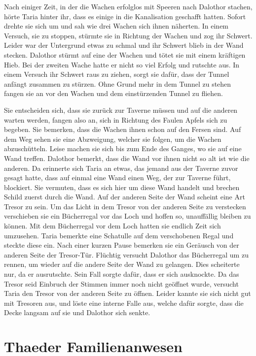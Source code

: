 \documentclass[10pt,twoside,twocolumn,openany]{book}
\begin{document}
	Nach einiger Zeit, in der die Wachen erfolglos mit Speeren nach Dalothor stachen, hörte Taria hinter ihr, dass es einige in die Kanalisation geschafft hatten. Sofort drehte sie sich um und sah wie drei Wachen sich ihnen näherten. In einem Versuch, sie zu stoppen, stürmte sie in Richtung der Wachen und zog ihr Schwert. Leider war der Untergrund etwas zu schmal und ihr Schwert blieb in der Wand stecken. Dalothor stürmt auf eine der Wachen und tötet sie mit einem kräftigen Hieb. Bei der zweiten Wache hatte er nicht so viel Erfolg und rutschte aus. In einem Versuch ihr Schwert raus zu ziehen, sorgt sie dafür, dass der Tunnel anfängt zusammen zu stürzen. Ohne Grund mehr in dem Tunnel zu stehen fangen sie an vor den Wachen und dem einstürzenden Tunnel zu fliehen. 

	Sie entscheiden sich, dass sie zurück zur Taverne müssen und auf die anderen warten werden, fangen also an, sich in Richtung des Faulen Apfels sich zu begeben. Sie bemerken, dass die Wachen ihnen schon auf den Fersen sind. Auf dem Weg sehen sie eine Abzweigung, welcher sie folgen, um die Wachen abzuschütteln. Leise machen sie sich bis zum Ende des Ganges, wo sie auf eine Wand treffen. Dalothor bemerkt, dass die Wand vor ihnen nicht so alt ist wie die anderen. Da erinnerte sich Taria an etwas, das jemand aus der Taverne zuvor gesagt hatte, dass auf einmal eine Wand einen Weg, der zur Taverne führt, blockiert. Sie vermuten, dass es sich hier um diese Wand handelt und brechen Schild zuerst durch die Wand. Auf der anderen Seite der Wand scheint eine Art Tresor zu sein. Um das Licht in dem Tresor von der anderen Seite zu verstecken verschieben sie ein Bücherregal vor das Loch und hoffen so, unauffällig bleiben zu können. Mit dem Bücherregal vor dem Loch hatten sie endlich Zeit sich umzusehen. Taria bemerkte eine Schatulle auf dem verschobenen Regal und steckte diese ein. Nach einer kurzen Pause bemerken sie ein Geräusch von der anderen Seite der Tresor-Tür. Flüchtig versucht Dalothor das Bücherregal um zu rennen, um wieder auf die andere Seite der Wand zu gelangen. Dies scheiterte nur, da er ausrutschte. Sein Fall sorgte dafür, dass er sich ausknockte. Da das Tresor seid Einbruch der Stimmen immer noch nicht geöffnet wurde, versucht Taria den Tresor von der anderen Seite zu öffnen. Leider kannte sie sich nicht gut mit Tresoren aus, und löste eine interne Falle aus, welche dafür sorgte, dass die Decke langsam auf sie und Dalothor sich senkte. 
	
	\section{Thaeder Familienanwesen}
	
\end{document}
